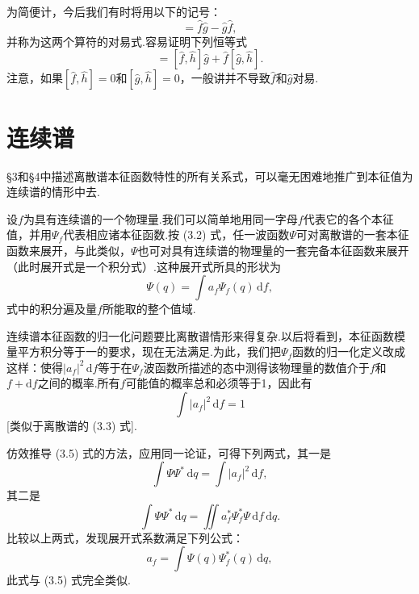 为简便计，今后我们有时将用以下的记号：
\begin{equation}
  [\hat{f},\hat{g}]=\hat{f}\hat{g}-\hat{g}\hat{f},
\end{equation}
并称为这两个算符的对易式.容易证明下列恒等式
\begin{equation}
  [\hat{f}\hat{g},\hat{h}]=[\hat{f},\hat{h}]\hat{g}+\hat{f}[\hat{g},\hat{h}].
\end{equation}
注意，如果$[\hat{f},\hat{h}]=0$和$[\hat{g},\hat{h}]=0$，一般讲并不导致$\hat{f}$和$\hat{g}$对易.

\section{连续谱}

§3和§4中描述离散谱本征函数特性的所有关系式，可以毫无困难地推广到本征值为连续谱的情形中去.

设$f$为具有连续谱的一个物理量.我们可以简单地用同一字母$f$代表它的各个本征值，并用$\varPsi_f$代表相应诸本征函数.按 (3.2) 式，任一波函数$\varPsi$可对离散谱的一套本征函数来展开，与此类似，$\varPsi$也可对具有连续谱的物理量的一套完备本征函数来展开（此时展开式是一个积分式）.这种展开式所具的形状为
\begin{equation}
  \varPsi(q)=\int a_f\varPsi_f(q)\,\mathrm{d}f,
\end{equation}
式中的积分遍及量$f$所能取的整个值域.

连续谱本征函数的归一化问题要比离散谱情形来得复杂.以后将看到，本征函数模量平方积分等于一的要求，现在无法满足.为此，我们把$\varPsi_f$函数的归一化定义改成这样：使得$|a_f|^2\,\mathrm{d}f$等于在$\varPsi_f$波函数所描述的态中测得该物理量的数值介于$f$和$f+\mathrm{d}f$之间的概率.所有$f$可能值的概率总和必须等于1，因此有
\begin{equation}
  \int|a_f|^2\,\mathrm{d}f=1
\end{equation}
[类似于离散谱的 (3.3) 式].

仿效推导 (3.5) 式的方法，应用同一论证，可得下列两式，其一是
\begin{equation*}
  \int\varPsi\varPsi^{*}\,\mathrm{d}q=\int|a_f|^2\,\mathrm{d}f,
\end{equation*}
其二是
\begin{equation*}
  \int\varPsi\varPsi^{*}\,\mathrm{d}q
  =\iint a_f^{*}\varPsi_f^{*}\varPsi\,\mathrm{d}f\,\mathrm{d}q.
\end{equation*}
比较以上两式，发现展开式系数满足下列公式：
\begin{equation}
  a_f=\int\varPsi(q)\varPsi_f^{*}(q)\,\mathrm{d}q,
\end{equation}
此式与 (3.5) 式完全类似.

